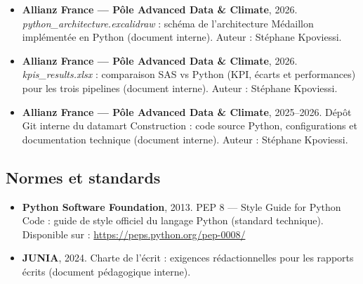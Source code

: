 \begin{itemize}[leftmargin=1.5cm]
    \item \textbf{Allianz France — Pôle Advanced Data \& Climate}, 2026. \textit{python\_architecture.excalidraw} : schéma de l’architecture Médaillon implémentée en Python (document interne).  
    Auteur : Stéphane Kpoviessi.

    \item \textbf{Allianz France — Pôle Advanced Data \& Climate}, 2026. \textit{kpis\_results.xlsx} : comparaison SAS vs Python (KPI, écarts et performances) pour les trois pipelines (document interne).  
    Auteur : Stéphane Kpoviessi.

    \item \textbf{Allianz France — Pôle Advanced Data \& Climate}, 2025--2026. Dépôt Git interne du datamart Construction : code source Python, configurations et documentation technique (document interne).  
    Auteur : Stéphane Kpoviessi.

\end{itemize}

\vspace{0.3cm}

\subsection*{Normes et standards}

\begin{itemize}[leftmargin=1.5cm]

    \item \textbf{Python Software Foundation}, 2013. PEP 8 — Style Guide for Python Code : guide de style officiel du langage Python (standard technique).  
    Disponible sur : \url{https://peps.python.org/pep-0008/}

    \item \textbf{JUNIA}, 2024. Charte de l’écrit : exigences rédactionnelles pour les rapports écrits (document pédagogique interne).  

\end{itemize}